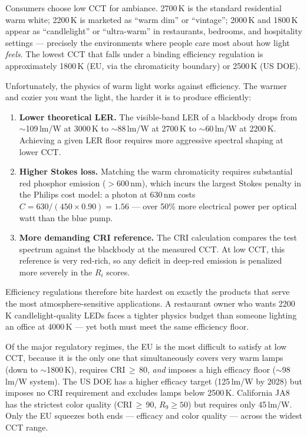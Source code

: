 \documentclass[11pt]{article}
\begin{document}
Consumers choose low CCT for ambiance.  2700\,K is the standard
residential warm white; 2200\,K is marketed as ``warm dim'' or
``vintage''; 2000\,K and 1800\,K appear as ``candlelight'' or
``ultra-warm'' in restaurants, bedrooms, and hospitality settings ---
precisely the environments where people care most about how light
\emph{feels}.  The lowest CCT that falls under a binding efficiency
regulation is approximately 1800\,K (EU, via the chromaticity boundary)
or 2500\,K (US DOE).

Unfortunately, the physics of warm light works against efficiency.  The
warmer and cozier you want the light, the harder it is to produce
efficiently:

\begin{enumerate}
\item \textbf{Lower theoretical LER.}  The visible-band LER of a
  blackbody drops from $\sim$109\,lm/W at 3000\,K to $\sim$88\,lm/W at
  2700\,K to $\sim$60\,lm/W at 2200\,K.  Achieving a given LER floor
  requires more aggressive spectral shaping at lower CCT.

\item \textbf{Higher Stokes loss.}  Matching the warm chromaticity
  requires substantial red phosphor emission ($>$600\,nm), which incurs
  the largest Stokes penalty in the Philips cost model: a photon at
  630\,nm costs $C = 630/(450 \times 0.90) = 1.56$ --- over 50\% more
  electrical power per optical watt than the blue pump.

\item \textbf{More demanding CRI reference.}  The CRI calculation
  compares the test spectrum against the blackbody at the measured CCT.
  At low CCT, this reference is very red-rich, so any deficit in deep-red
  emission is penalized more severely in the $R_i$ scores.
\end{enumerate}

\noindent Efficiency regulations therefore bite hardest on exactly the
products that serve the most atmosphere-sensitive applications.  A
restaurant owner who wants 2200\,K candlelight-quality LEDs faces a
tighter physics budget than someone lighting an office at 4000\,K ---
yet both must meet the same efficiency floor.

Of the major regulatory regimes, the EU is the most difficult to
satisfy at low CCT, because it is the only one that simultaneously
covers very warm lamps (down to $\sim$1800\,K), requires CRI\,$\geq$\,80,
\emph{and} imposes a high efficacy floor ($\sim$98\,lm/W system).
The US DOE has a higher efficacy target (125\,lm/W by 2028) but
imposes no CRI requirement and excludes lamps below 2500\,K.
California JA8 has the strictest color quality (CRI\,$\geq$\,90,
$R_9 \geq 50$) but requires only 45\,lm/W.  Only the EU squeezes
both ends --- efficacy and color quality --- across the widest CCT
range.
\end{document}
